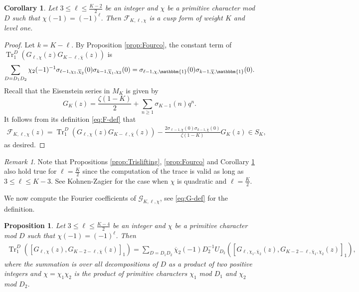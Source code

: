 \documentclass[11pt,letterpaper,reqno]{amsart}
\newcommand\ques[1]{\textcolor{blue}{\textbf{Question}: #1}}
\numberwithin{figure}{section}
\numberwithin{table}{section}
\theoremstyle{definition}
\theoremstyle{plain}
\newtheorem{corollary}{Corollary}[section]
\newtheorem{proposition}[theorem]{Proposition}
\theoremstyle{definition}
\theoremstyle{definition}
\theoremstyle{remark}
\newtheorem{remark}{Remark}[section]
\numberwithin{equation}{section}
\theoremstyle{remark}
\DeclareMathOperator{\Tr}{Tr}
\begin{document}
\begin{corollary}\label{co:cuspproj}
   Let $3\leq \ell\leq\frac{K-2}{2}$ be an integer 
   and  $\chi$ be a primitive character mod $D$ such that $\chi(-1)=(-1)^{\ell}$. Then $\mathcal{F}_{K,\ell,\chi}$ is a cusp form of weight $K$ and level one.
\end{corollary}
\begin{proof}Let $k=K-\ell$.
    By Proposition \ref{prop:Fourco}, the constant term of  $\Tr^D_1(G_{\ell,\chi}(z)G_{K-\ell,\overline{\chi}}(z)) $  is 
\begin{align*}\sum_{D=D_1D_2}\chi_2(-1)^{-1}\sigma_{\ell-1,\chi_1,\overline{\chi}_{2}}(0)\sigma_{k-1,\overline{\chi}_{1},\chi_2}(0)=\sigma_{\ell-1,\chi,\mathbbm{1}}(0)\sigma_{k-1,\overline{\chi},\mathbbm{1}}(0).\end{align*}
Recall that the  Eisenstein series in $M_K$ is given by
$$G_K(z)=\frac{\zeta(1-K)}{2}+\sum_{n\geq1}\sigma_{K-1}(n)q^n.$$ 
It follows from its definition \eqref{eq:F-def} that
 \begin{align*}    \mathcal{F}_{K,\ell,\chi}(z)=\Tr_1^D(G_{\ell,\chi}(z)G_{K-\ell,\overline{\chi}}(z))-\frac{2\sigma_{\ell-1,\chi}(0)\sigma_{k-1,\overline{\chi}}(0)}{\zeta(1-K)}G_K(z)\in S_K,
 \end{align*}
 as desired.
\end{proof}
\begin{remark}\label{remark:traceofprodwhenl=k}
    Note that Propositions \ref{prop:Trislifting}, \ref{prop:Fourco} and Corollary \ref{co:cuspproj} also hold true for $\ell=\frac{K}{2}$ since the computation of the trace  is valid as long as $3\leq\ell\leq K-3$. See Kohnen-Zagier \cite[p. 193]{Kohnen-Zagier1981} for the case when $\chi$ is quadratic and $\ell=\frac{K}{2}$.
\end{remark}
We now compute the Fourier coefficients of $\mathcal{G}_{K,\ell,\chi}$, see \eqref{eq:G-def} for the definition.
\begin{proposition}\label{prop:TrisliftingRankinCohen}
     Let $3\leq \ell\leq\frac{K-4}{2}$ be an integer 
     and  $\chi$ be a primitive character mod $D$ such that $\chi(-1)=(-1)^{\ell}$. Then
    \begin{align*}
    \Tr^D_1([G_{\ell,\chi}(z),G_{K-2-\ell,\overline{\chi}}(z)]_1)=\sum_{D=D_1D_2}\overline{\chi}_2(-1)D_2^{-1}U_{D_2}\left([G_{\ell,\chi_1,\overline{\chi}_{2}}(z),G_{K-2-\ell,\overline{\chi}_{1},\chi_2}(z)]_1\right),
    \end{align*}
    where the summation is over all decompositions of $D$ as a product of two positive integers and $\chi=\chi_1\chi_2$ is the product of primitive characters $\chi_1$ mod $D_1$ and $\chi_2$ mod $D_2$.
\end{proposition}
\end{document}
